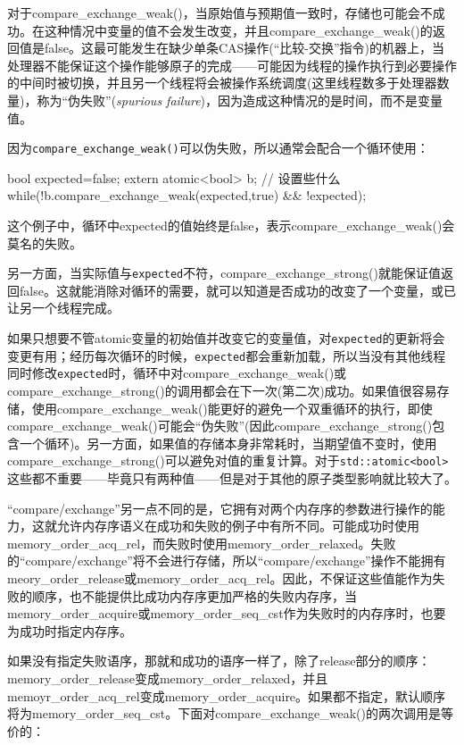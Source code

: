 对于compare\_exchange\_weak()，当原始值与预期值一致时，存储也可能会不成功。在这种情况中变量的值不会发生改变，并且compare\_exchange\_weak()的返回值是false。这最可能发生在缺少单条CAS操作(“比较-交换”指令)的机器上，当处理器不能保证这个操作能够原子的完成——可能因为线程的操作执行到必要操作的中间时被切换，并且另一个线程将会被操作系统调度(这里线程数多于处理器数量)，称为“伪失败”(\textit{spurious failure})，因为造成这种情况的是时间，而不是变量值。

因为\texttt{compare\_exchange\_weak()}可以伪失败，所以通常会配合一个循环使用：

\begin{cpp}
bool expected=false;
extern atomic<bool> b; // 设置些什么
while(!b.compare_exchange_weak(expected,true) && !expected);
\end{cpp}

这个例子中，循环中expected的值始终是false，表示compare\_exchange\_weak()会莫名的失败。

另一方面，当实际值与\texttt{expected}不符，compare\_exchange\_strong()就能保证值返回false。这就能消除对循环的需要，就可以知道是否成功的改变了一个变量，或已让另一个线程完成。

如果只想要不管atomic变量的初始值并改变它的变量值，对\texttt{expected}的更新将会变更有用；经历每次循环的时候，\texttt{expected}都会重新加载，所以当没有其他线程同时修改\texttt{expected}时，循环中对compare\_exchange\_weak()或compare\_exchange\_strong()的调用都会在下一次(第二次)成功。如果值很容易存储，使用compare\_exchange\_weak()能更好的避免一个双重循环的执行，即使compare\_exchange\_weak()可能会“伪失败”(因此compare\_exchange\_strong()包含一个循环)。另一方面，如果值的存储本身非常耗时，当期望值不变时，使用compare\_exchange\_strong()可以避免对值的重复计算。对于\texttt{std::atomic<bool>}这些都不重要——毕竟只有两种值——但是对于其他的原子类型影响就比较大了。

 “compare/exchange”另一点不同的是，它拥有对两个内存序的参数进行操作的能力，这就允许内存序语义在成功和失败的例子中有所不同。可能成功时使用memory\_order\_acq\_rel，而失败时使用memory\_order\_relaxed。失败的“compare/exchange”将不会进行存储，所以“compare/exchange”操作不能拥有meory\_order\_release或memory\_order\_acq\_rel。因此，不保证这些值能作为失败的顺序，也不能提供比成功内存序更加严格的失败内存序，当memory\_order\_acquire或memory\_order\_seq\_cst作为失败时的内存序时，也要为成功时指定内存序。

如果没有指定失败语序，那就和成功的语序一样了，除了release部分的顺序：memory\_order\_release变成memory\_order\_relaxed，并且memoyr\_order\_acq\_rel变成memory\_order\_acquire。如果都不指定，默认顺序将为memory\_order\_seq\_cst。下面对compare\_exchange\_weak()的两次调用是等价的：

